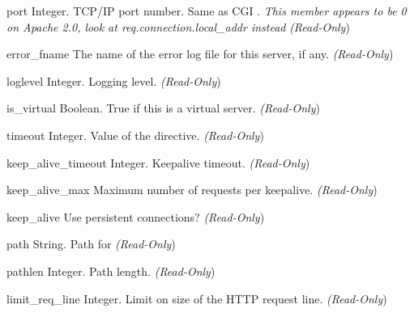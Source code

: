 \begin{memberdesc}[server]{port}
Integer. TCP/IP port number. Same as CGI .
\emph{This member appears to be 0 on Apache 2.0, look at req.connection.local_addr instead}
\emph{(Read-Only})
\end{memberdesc}

\begin{memberdesc}[server]{error_fname}
The name of the error log file for this server, if any.
\emph{(Read-Only})
\end{memberdesc}

\begin{memberdesc}[server]{loglevel}
Integer. Logging level.
\emph{(Read-Only})
\end{memberdesc}

\begin{memberdesc}[server]{is_virtual}
Boolean. True if this is a virtual server.
\emph{(Read-Only})
\end{memberdesc}

\begin{memberdesc}[server]{timeout}
Integer. Value of the  directive.
\emph{(Read-Only})
\end{memberdesc}

\begin{memberdesc}[server]{keep_alive_timeout}
Integer. Keepalive timeout.
\emph{(Read-Only})
\end{memberdesc}

\begin{memberdesc}[server]{keep_alive_max}
Maximum number of requests per keepalive.
\emph{(Read-Only})
\end{memberdesc}

\begin{memberdesc}[server]{keep_alive}
Use persistent connections?
\emph{(Read-Only})
\end{memberdesc}

\begin{memberdesc}[server]{path}
String. Path for 
\emph{(Read-Only})
\end{memberdesc}

\begin{memberdesc}[server]{pathlen}
Integer. Path length.
\emph{(Read-Only})
\end{memberdesc}

\begin{memberdesc}[server]{limit_req_line}
Integer. Limit on size of the HTTP request line.
\emph{(Read-Only})
\end{memberdesc}

